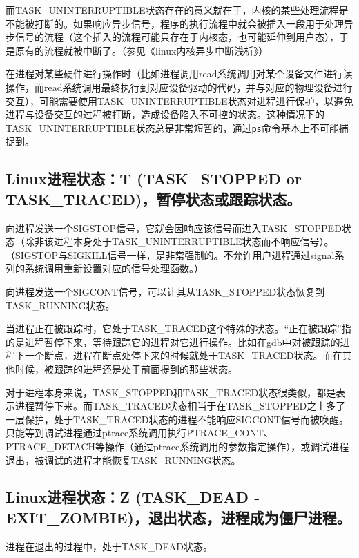 \documentclass[doctor,openright,twoside]{sjtuthesis}
\newcommand{\passthrough}[1]{#1}
\theoremstyle{plain}
\theoremstyle{definition}
\theoremstyle{remark}
\theoremstyle{ocrenumbox}
\theoremstyle{plain}
\begin{document}
而TASK\_UNINTERRUPTIBLE状态存在的意义就在于，内核的某些处理流程是不能被打断的。如果响应异步信号，程序的执行流程中就会被插入一段用于处理异步信号的流程（这个插入的流程可能只存在于内核态，也可能延伸到用户态），于是原有的流程就被中断了。（参见《linux内核异步中断浅析》）

在进程对某些硬件进行操作时（比如进程调用read系统调用对某个设备文件进行读操作，而read系统调用最终执行到对应设备驱动的代码，并与对应的物理设备进行交互），可能需要使用TASK\_UNINTERRUPTIBLE状态对进程进行保护，以避免进程与设备交互的过程被打断，造成设备陷入不可控的状态。这种情况下的TASK\_UNINTERRUPTIBLE状态总是非常短暂的，通过\passthrough{\lstinline!ps!}命令基本上不可能捕捉到。

\hypertarget{linuxt-task_stopped-or-task_traced}{%
\subsection{Linux进程状态：T (TASK\_STOPPED or TASK\_TRACED)，暂停状态或跟踪状态。}\label{linuxt-task_stopped-or-task_traced}}

向进程发送一个SIGSTOP信号，它就会因响应该信号而进入TASK\_STOPPED状态（除非该进程本身处于TASK\_UNINTERRUPTIBLE状态而不响应信号）。（SIGSTOP与SIGKILL信号一样，是非常强制的。不允许用户进程通过signal系列的系统调用重新设置对应的信号处理函数。）

向进程发送一个SIGCONT信号，可以让其从TASK\_STOPPED状态恢复到TASK\_RUNNING状态。

当进程正在被跟踪时，它处于TASK\_TRACED这个特殊的状态。``正在被跟踪''指的是进程暂停下来，等待跟踪它的进程对它进行操作。比如在gdb中对被跟踪的进程下一个断点，进程在断点处停下来的时候就处于TASK\_TRACED状态。而在其他时候，被跟踪的进程还是处于前面提到的那些状态。

对于进程本身来说，TASK\_STOPPED和TASK\_TRACED状态很类似，都是表示进程暂停下来。而TASK\_TRACED状态相当于在TASK\_STOPPED之上多了一层保护，处于TASK\_TRACED状态的进程不能响应SIGCONT信号而被唤醒。只能等到调试进程通过ptrace系统调用执行PTRACE\_CONT、PTRACE\_DETACH等操作（通过ptrace系统调用的参数指定操作），或调试进程退出，被调试的进程才能恢复TASK\_RUNNING状态。

\hypertarget{linuxz-task_dead---exit_zombie}{%
\subsection{Linux进程状态：Z (TASK\_DEAD - EXIT\_ZOMBIE)，退出状态，进程成为僵尸进程。}\label{linuxz-task_dead---exit_zombie}}

进程在退出的过程中，处于TASK\_DEAD状态。
\end{document}
